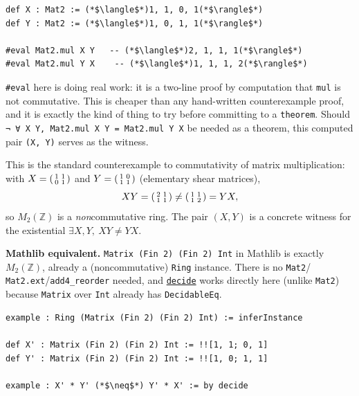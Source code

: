 \begin{lstlisting}
def X : Mat2 := (*$\langle$*)1, 1, 0, 1(*$\rangle$*)
def Y : Mat2 := (*$\langle$*)1, 0, 1, 1(*$\rangle$*)

#eval Mat2.mul X Y   -- (*$\langle$*)2, 1, 1, 1(*$\rangle$*)
#eval Mat2.mul Y X    -- (*$\langle$*)1, 1, 1, 2(*$\rangle$*)
\end{lstlisting}

\texttt{\#eval} here is doing real work: it is a two-line proof by computation that \texttt{mul} is not commutative. This is cheaper than any hand-written counterexample proof, and it is exactly the kind of thing to try before committing to a \texttt{theorem}. Should \texttt{¬ ∀ X Y, Mat2.mul X Y = Mat2.mul Y X} be needed as a theorem, this computed pair \texttt{(X, Y)} serves as the witness.

\begin{mathreading}

This is the standard counterexample to commutativity of matrix multiplication: with \(X = \begin{psmallmatrix}1&1\\0&1\end{psmallmatrix}\) and \(Y = \begin{psmallmatrix}1&0\\1&1\end{psmallmatrix}\) (elementary shear matrices), \[
XY = \begin{psmallmatrix}2&1\\1&1\end{psmallmatrix} \neq
\begin{psmallmatrix}1&1\\1&2\end{psmallmatrix} = YX,
\] so \(M_2(\mathbb{Z})\) is a \emph{non}commutative ring. The pair \((X, Y)\) is a concrete witness for the existential \(\exists X, Y,\ XY \neq YX\).

\end{mathreading}

\textbf{Mathlib equivalent.} \texttt{Matrix (Fin 2) (Fin 2) Int} in Mathlib is exactly \(M_2(\mathbb{Z})\), already a (noncommutative) \texttt{Ring} instance. There is no \texttt{Mat2}/ \texttt{Mat2.ext}/\texttt{add4\_\allowbreak{}reorder} needed, and \href{https://lean-lang.org/doc/reference/latest/Tactic-Proofs/Tactic-Reference/}{\texttt{decide}} works directly here (unlike \texttt{Mat2}) because \texttt{Matrix} over \texttt{Int} already has \texttt{DecidableEq}.

\begin{lstlisting}
example : Ring (Matrix (Fin 2) (Fin 2) Int) := inferInstance

def X' : Matrix (Fin 2) (Fin 2) Int := !![1, 1; 0, 1]
def Y' : Matrix (Fin 2) (Fin 2) Int := !![1, 0; 1, 1]

example : X' * Y' (*$\neq$*) Y' * X' := by decide
\end{lstlisting}

